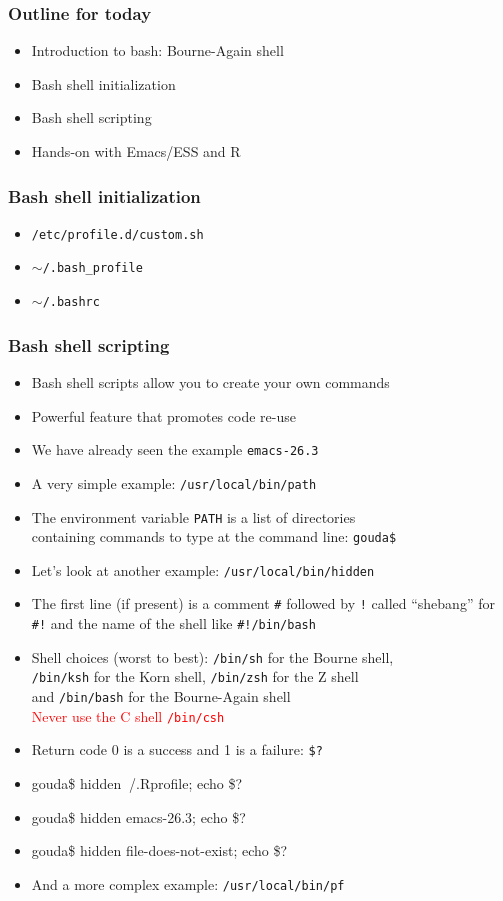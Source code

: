 \documentclass[11pt,pdftex,dvipsnames,usenames,helvetica]{beamer}
\newcommand*{\red}[1]{\textcolor{red}{#1}}
\begin{document}
\begin{frame}
\frametitle{Outline for today}

\begin{itemize}
\item Introduction to bash: Bourne-Again shell
\item Bash shell initialization
\item Bash shell scripting
\item Hands-on with Emacs/ESS and R
\end{itemize}
\end{frame}


\begin{frame}
\frametitle{Bash shell initialization}
\begin{itemize}
\item {\tt /etc/profile.d/custom.sh }
\item {\tt $\sim$/.bash\_profile}
\item {\tt $\sim$/.bashrc}
\end{itemize}
\end{frame}

\begin{frame}
\frametitle{Bash shell scripting}
\begin{itemize}
\item Bash shell scripts allow you to create your own commands
\item Powerful feature that promotes code re-use
\item We have already seen the example {\tt emacs-26.3}
\item A very simple example: {\tt /usr/local/bin/path}
\item The environment variable {\tt PATH} is a list of directories\\
containing commands to type at the command line:
 {\tt gouda\$}
\item Let's look at another example: {\tt /usr/local/bin/hidden }
\item The first line (if present) is a comment {\tt \#} followed by
  {\tt !}  called ``shebang'' for {\tt \#!} and the name of the shell
  like {\tt \#!/bin/bash}
\item Shell choices (worst to best): {\tt /bin/sh} for the Bourne shell,\\
{\tt /bin/ksh} for the Korn shell, {\tt /bin/zsh} for the Z shell\\
and {\tt /bin/bash} for the Bourne-Again shell\\
\red{Never use the C shell {\tt /bin/csh}}
\item Return code 0 is a success and 1 is a failure: {\tt \$?}
\item {gouda\$ hidden $~$/.Rprofile; echo \$?}
\item {gouda\$ hidden emacs-26.3; echo \$?}
\item {gouda\$ hidden file-does-not-exist; echo \$?}
\item And a more complex example: {\tt /usr/local/bin/pf}
\end{itemize}
\end{frame}
\end{document}
